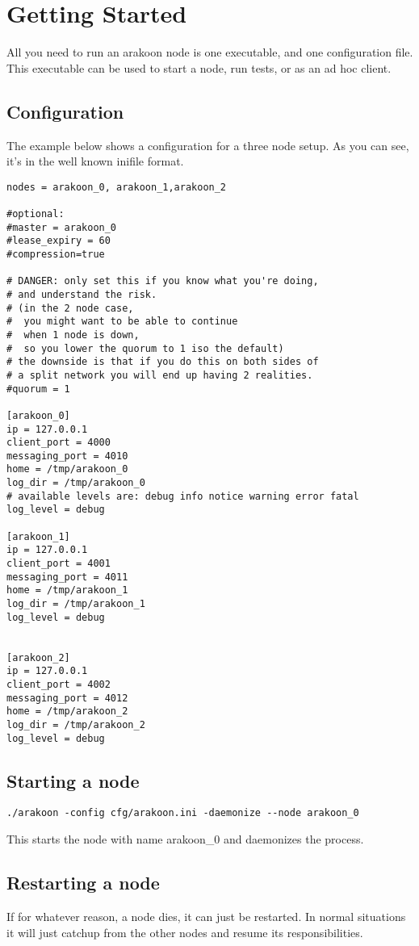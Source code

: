\documentclass[notitlepage]{article}
\begin{document}
\section{Getting Started}
All you need to run an arakoon node is one executable, and one configuration file. 
This executable can be used to start a node, run tests, or as an ad hoc client.
\subsection{Configuration}
The example below shows a configuration for a three node setup. 
As you can see, it's in the well known inifile format.

\begin{verbatim}
nodes = arakoon_0, arakoon_1,arakoon_2

#optional:
#master = arakoon_0
#lease_expiry = 60
#compression=true

# DANGER: only set this if you know what you're doing,
# and understand the risk.
# (in the 2 node case,
#  you might want to be able to continue
#  when 1 node is down,
#  so you lower the quorum to 1 iso the default)
# the downside is that if you do this on both sides of
# a split network you will end up having 2 realities.
#quorum = 1

[arakoon_0]
ip = 127.0.0.1
client_port = 4000
messaging_port = 4010
home = /tmp/arakoon_0
log_dir = /tmp/arakoon_0
# available levels are: debug info notice warning error fatal
log_level = debug

[arakoon_1]
ip = 127.0.0.1
client_port = 4001
messaging_port = 4011
home = /tmp/arakoon_1
log_dir = /tmp/arakoon_1
log_level = debug


[arakoon_2]
ip = 127.0.0.1
client_port = 4002
messaging_port = 4012
home = /tmp/arakoon_2
log_dir = /tmp/arakoon_2
log_level = debug
\end{verbatim}

\subsection{Starting a node}

\begin{verbatim}
./arakoon -config cfg/arakoon.ini -daemonize --node arakoon_0 
\end{verbatim}
This starts the node with name arakoon\_0 and daemonizes the process.


\subsection{Restarting a node}
If for whatever reason, a node dies, it can just be restarted. 
In normal situations it will just catchup from the other nodes and resume its responsibilities.
\end{document}
